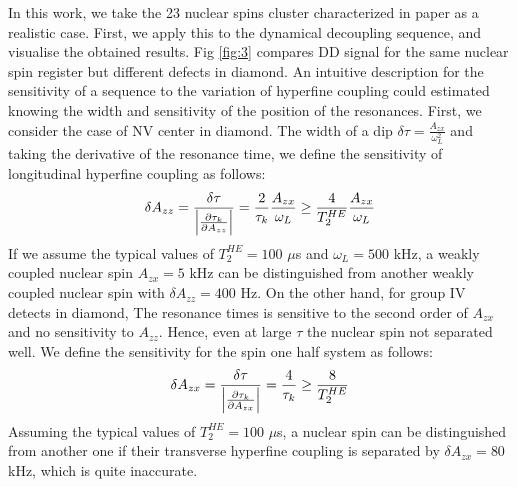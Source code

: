 \documentclass[%
 reprint,
superscriptaddress,
 amsmath,amssymb,
 aps,
]{revtex4-2}
\begin{document}
In this work, we take the 23 nuclear spins cluster characterized in paper \cite{abobeih2019atomic} as a realistic case. 
First, we apply this to the dynamical decoupling sequence, and visualise the obtained results. 
Fig \ref{fig:3} compares DD signal for the same nuclear spin register but different defects in diamond. 
An intuitive description for the sensitivity of a sequence to the variation of hyperfine coupling could estimated knowing the width and sensitivity of the position of the resonances. 
First, we consider the case of NV center in diamond. 
The width of a dip $\delta \tau = \frac{A_{zx}}{\omega_L^2}$  and taking the derivative of the resonance time, we define the sensitivity of longitudinal hyperfine coupling as follows:
\begin{gather}
	\delta A_{zz} = \frac{\delta \tau}{\abs{\frac{\partial \tau_k}{\partial A_{zz}}}} = \frac{2}{\tau_k} \frac{A_{zx}}{\omega_L} \ge \frac{4}{T_2^{HE}} \frac{A_{zx}}{\omega_L}
\end{gather}
If we assume the typical values of $T_2^{HE} = 100 $ $\mu$s and $\omega_L=500 $ kHz, a weakly coupled nuclear spin $A_{zx}=5$ kHz can be distinguished from another weakly coupled nuclear spin with $\delta A_{zz} = 400$ Hz. On the other hand, for group IV detects in diamond, The resonance times is sensitive to the second order of $A_{zx}$ and no sensitivity to $A_{zz}$. Hence, even at large $\tau$ the nuclear spin not separated well. We define the sensitivity for the spin one half system as follows:
\begin{gather}
	\delta A_{zx} = \frac{\delta \tau}{\abs{\frac{\partial \tau_k}{\partial A_{zx}}}} = \frac{4}{\tau_k} \ge \frac{8}{T_2^{HE}}
\end{gather}
Assuming the typical values of $T_2^{HE} = 100 $ $\mu$s, a nuclear spin can be distinguished from another one if their transverse hyperfine coupling is separated by $\delta A_{zx} = 80$ kHz, which is quite inaccurate.\\
\end{document}
